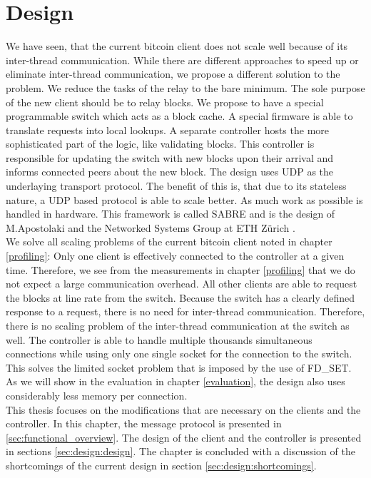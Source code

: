 \chapter{\label{design}Design}
We have seen, that the current bitcoin client does not scale well because of its inter-thread communication. While there are different approaches to speed up or eliminate inter-thread communication, we propose a different solution to the problem. We reduce the tasks of the relay to the bare minimum. The sole purpose of the new client should be to relay blocks. We propose to have a special programmable switch which acts as a block cache. A special firmware is able to translate requests into local lookups. A separate controller hosts the more sophisticated part of the logic, like validating blocks. This controller is responsible for updating the switch with new blocks upon their arrival and informs connected peers about the new block. The design uses UDP as the underlaying transport protocol. The benefit of this is, that due to its stateless nature, a UDP based protocol is able to scale better. As much work as possible is handled in hardware. This framework is called SABRE and is the design of M.Apostolaki and the Networked Systems Group at ETH Zürich \cite{apostolaki2018}.\\
We solve all scaling problems of the current bitcoin client noted in chapter \ref{profiling}: Only one client is effectively connected to the controller at a given time. Therefore, we see from the measurements in chapter \ref{profiling} that we do not expect a large communication overhead. All other clients are able to request the blocks at line rate from the switch. Because the switch has a clearly defined response to a request, there is no need for inter-thread communication. Therefore, there is no scaling problem of the inter-thread communication at the switch as well. The controller is able to handle multiple thousands simultaneous connections while using only one single socket for the connection to the switch. This solves the limited socket problem that is imposed by the use of FD\_SET. As we will show in the evaluation in chapter \ref{evaluation}, the design also uses considerably less memory per connection.\\
This thesis focuses on the modifications that are necessary on the clients and the controller. In this chapter, the message protocol is presented in \ref{sec:functional_overview}. The design of the client and the controller is presented in sections \ref{sec:design:design}. The chapter is concluded with a discussion of the shortcomings of the current design in section \ref{sec:design:shortcomings}.


